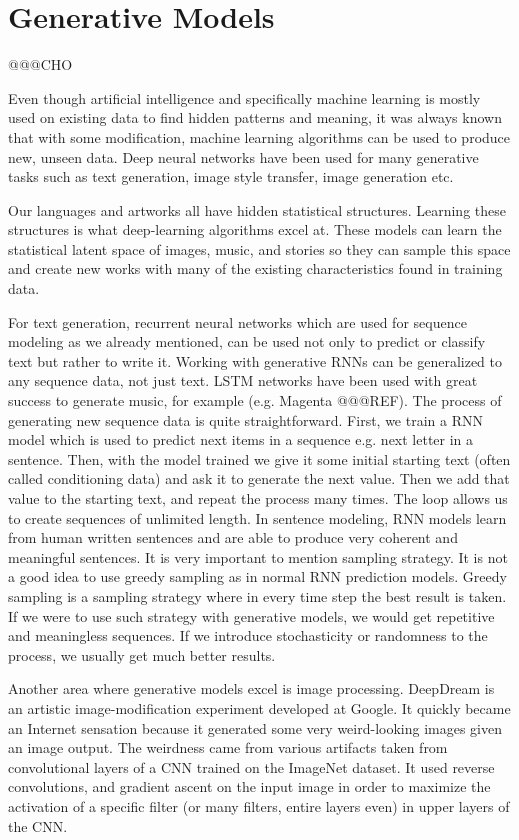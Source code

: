 \documentclass[b5paper]{book}
\begin{document}
\section{Generative Models}

@@@CHO

Even though artificial intelligence and specifically machine learning is mostly used on existing data to find hidden patterns and meaning, it was always known that with some modification, machine learning algorithms can be used to produce new, unseen data. Deep neural networks have been used for many generative tasks such as text generation, image style transfer, image generation etc.

Our languages and artworks all have hidden statistical structures. Learning these structures is what deep-learning algorithms excel at. These models can learn the statistical latent space of images, music, and stories so they can sample this space and create new works with many of the existing characteristics found in training data.

For text generation, recurrent neural networks which are used for sequence modeling as we already mentioned, can be used not only to predict or classify text but rather to write it. Working with generative RNNs can be generalized to any sequence data, not just text. LSTM networks have been used with great success to generate music, for example (e.g. Magenta @@@REF). The process of generating new sequence data is quite straightforward. First, we train a RNN model which is used to predict next items in a sequence e.g. next letter in a sentence. Then, with the model trained we give it some initial starting text (often called conditioning data) and ask it to generate the next value. Then we add that value to the starting text, and repeat the process many times. The loop allows us to create sequences of unlimited length. In sentence modeling, RNN models learn from human written sentences and are able to produce very coherent and meaningful sentences. It is very important to mention sampling strategy. It is not a good idea to use greedy sampling as in normal RNN prediction models. Greedy sampling is a sampling strategy where in every time step the best result is taken. If we were to use such strategy with generative models, we would get repetitive and meaningless sequences. If we introduce stochasticity or randomness to the process, we usually get much better results.

Another area where generative models excel is image processing. DeepDream is an artistic image-modification experiment developed at Google. It quickly became an Internet sensation because it generated some very weird-looking images given an image output. The weirdness came from various artifacts taken from convolutional layers of a CNN trained on the ImageNet dataset. It used reverse convolutions, and gradient ascent on the input image in order to maximize the activation of a specific filter (or many filters, entire layers even) in upper layers of the CNN.
\end{document}
